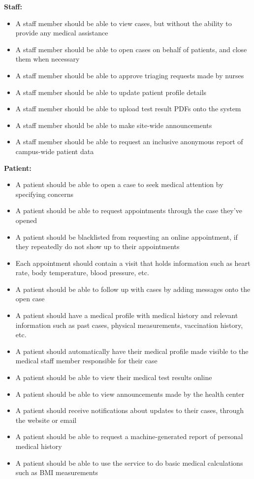 \documentclass[a4paper, 12pt, titlepage]{article}
\begin{document}
  \textbf{Staff:}
  \begin{itemize}
    \item A staff member should be able to view cases, but without the ability to provide any medical assistance
    \item A staff member should be able to open cases on behalf of patients, and close them when necessary
    \item A staff member should be able to approve triaging requests made by nurses
    \item A staff member should be able to update patient profile details
    \item A staff member should be able to upload test result PDFs onto the system
    \item A staff member should be able to make site-wide announcements
    \item A staff member should be able to request an inclusive anonymous report of campus-wide patient data
  \end{itemize}

  \textbf{Patient:}
  \begin{itemize}
    \item A patient should be able to open a case to seek medical attention by specifying concerns
    \item A patient should be able to request appointments through the case they've opened
    \item A patient should be blacklisted from requesting an online appointment, if they repeatedly do not show up to their appointments
    \item Each appointment should contain a visit that holds information such as heart rate, body temperature, blood pressure, etc.
    \item A patient should be able to follow up with cases by adding messages onto the open case
    \item A patient should have a medical profile with medical history and relevant information such as past cases, physical measurements, vaccination history, etc.
    \item A patient should automatically have their medical profile made visible to the medical staff member responsible for their case
    \item A patient should be able to view their medical test results online
    \item A patient should be able to view announcements made by the health center
    \item A patient should receive notifications about updates to their cases, through the website or email
    \item A patient should be able to request a machine-generated report of personal medical history
    \item A patient should be able to use the service to do basic medical calculations such as BMI measurements
  \end{itemize}
\end{document}
